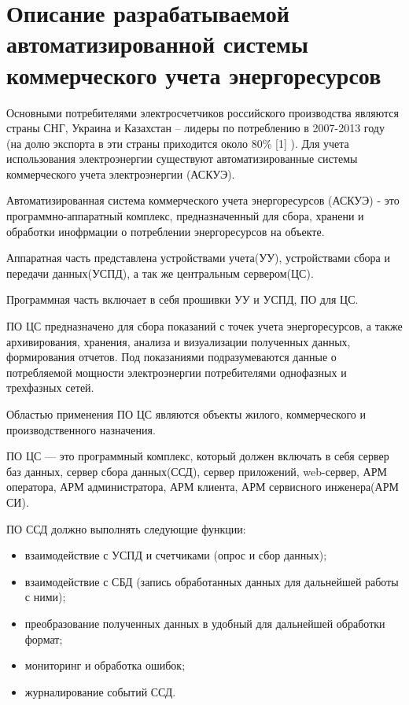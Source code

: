 \newpage
\section{Описание разрабатываемой автоматизированной системы коммерческого учета энергоресурсов}
\setcounter{figure}{0}

Основными  потребителями  электросчетчиков российского производства являются страны СНГ, Украина и Казахстан – лидеры по потреблению в 2007-2013 году (на долю экспорта в эти страны приходится около  80\% [1] ). Для учета использования электроэнергии существуют автоматизированные системы коммерческого учета электроэнергии (АСКУЭ).

Автоматизированная система коммерческого учета энергоресурсов (АСКУЭ) - это программно-аппаратный комплекс, предназначенный для сбора, хранени и обработки инофрмации о потреблении энергоресурсов на объекте. 

Аппаратная часть представлена устройствами учета(УУ), устройствами сбора и передачи данных(УСПД), а так же центральным сервером(ЦС).

Программная часть включает в себя прошивки УУ и УСПД, ПО для ЦС.

ПО ЦС предназначено для сбора показаний с точек учета энергоресурсов, а также архивирования, хранения, анализа и визуализации полученных данных, формирования отчетов. Под показаниями подразумеваются данные о потребляемой мощности электроэнергии потребителями однофазных и трехфазных сетей.

Областью применения ПО ЦС являются объекты жилого, коммерческого и производственного назначения.

ПО ЦС — это программный комплекс, который должен включать в себя сервер баз данных, сервер сбора данных(ССД), сервер приложений, web-сервер, АРМ оператора, АРМ администратора, АРМ клиента, АРМ сервисного инженера(АРМ СИ).

ПО ССД должно выполнять следующие функции:
\begin{itemize}
 \item взаимодействие с УСПД и счетчиками (опрос и сбор данных);
 \item взаимодействие с СБД (запись обработанных данных для дальнейшей работы с ними);
 \item преобразование полученных данных в удобный для дальнейшей обработки формат;
 \item мониторинг и обработка ошибок;
 \item журналирование событий ССД.
\end{itemize}

